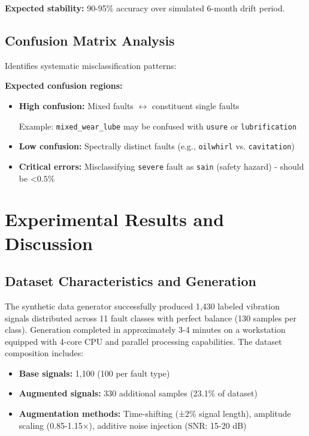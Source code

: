 \documentclass[11pt,a4paper]{article}
\begin{document}
\textbf{Expected stability:} 90-95\% accuracy over simulated 6-month drift period.

\subsection{Confusion Matrix Analysis}

Identifies systematic misclassification patterns:

\textbf{Expected confusion regions:}
\begin{itemize}[itemsep=0.3em]
    \item \textbf{High confusion:} Mixed faults $\leftrightarrow$ constituent single faults
    
    Example: \texttt{mixed\_wear\_lube} may be confused with \texttt{usure} or \texttt{lubrification}
    
    \item \textbf{Low confusion:} Spectrally distinct faults (e.g., \texttt{oilwhirl} vs. \texttt{cavitation})
    
    \item \textbf{Critical errors:} Misclassifying \texttt{severe} fault as \texttt{sain} (safety hazard) - should be $ $<$ 0.5\%$
\end{itemize}

\section{Experimental Results and Discussion}

\subsection{Dataset Characteristics and Generation}

The synthetic data generator successfully produced 1,430 labeled vibration signals distributed across 11 fault classes with perfect balance (130 samples per class). Generation completed in approximately 3-4 minutes on a workstation equipped with 4-core CPU and parallel processing capabilities. The dataset composition includes:

\begin{itemize}[leftmargin=*, itemsep=0.3em]
    \item \textbf{Base signals:} 1,100 (100 per fault type)
    \item \textbf{Augmented signals:} 330 additional samples (23.1\% of dataset)
    \item \textbf{Augmentation methods:} Time-shifting (±2\% signal length), amplitude scaling (0.85-1.15×), additive noise injection (SNR: 15-20 dB)
\end{itemize}
\end{document}
